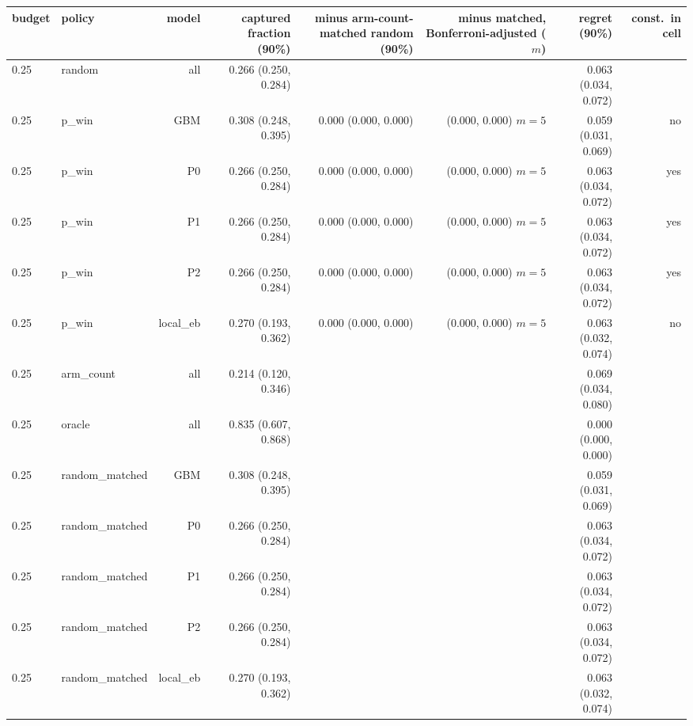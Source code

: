 \begin{tabular}{llrrrrrr}
\toprule
budget & policy & model & captured fraction (90\%) & minus arm-count-matched random (90\%) & minus matched, Bonferroni-adjusted ($m$) & regret (90\%) & const.\ in cell \\
\midrule
0.25 & random & all & 0.266 (0.250, 0.284) &  &  & 0.063 (0.034, 0.072) &  \\
0.25 & p\_win & GBM & 0.308 (0.248, 0.395) & 0.000 (0.000, 0.000) & (0.000, 0.000) $m=5$ & 0.059 (0.031, 0.069) & no \\
0.25 & p\_win & P0 & 0.266 (0.250, 0.284) & 0.000 (0.000, 0.000) & (0.000, 0.000) $m=5$ & 0.063 (0.034, 0.072) & yes \\
0.25 & p\_win & P1 & 0.266 (0.250, 0.284) & 0.000 (0.000, 0.000) & (0.000, 0.000) $m=5$ & 0.063 (0.034, 0.072) & yes \\
0.25 & p\_win & P2 & 0.266 (0.250, 0.284) & 0.000 (0.000, 0.000) & (0.000, 0.000) $m=5$ & 0.063 (0.034, 0.072) & yes \\
0.25 & p\_win & local\_eb & 0.270 (0.193, 0.362) & 0.000 (0.000, 0.000) & (0.000, 0.000) $m=5$ & 0.063 (0.032, 0.074) & no \\
0.25 & arm\_count & all & 0.214 (0.120, 0.346) &  &  & 0.069 (0.034, 0.080) &  \\
0.25 & oracle & all & 0.835 (0.607, 0.868) &  &  & 0.000 (0.000, 0.000) &  \\
0.25 & random\_matched & GBM & 0.308 (0.248, 0.395) &  &  & 0.059 (0.031, 0.069) &  \\
0.25 & random\_matched & P0 & 0.266 (0.250, 0.284) &  &  & 0.063 (0.034, 0.072) &  \\
0.25 & random\_matched & P1 & 0.266 (0.250, 0.284) &  &  & 0.063 (0.034, 0.072) &  \\
0.25 & random\_matched & P2 & 0.266 (0.250, 0.284) &  &  & 0.063 (0.034, 0.072) &  \\
0.25 & random\_matched & local\_eb & 0.270 (0.193, 0.362) &  &  & 0.063 (0.032, 0.074) &  \\

\end{tabular}
